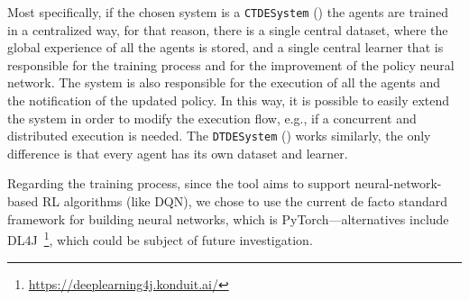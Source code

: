 Most specifically,
 if the chosen system is a \texttt{CTDESystem} () the agents are trained in a centralized way, 
 for that reason, there is  a single central dataset, 
 where the global experience of all the agents is stored, 
 and a single central learner that is responsible for the training process 
 and for the improvement of the policy neural network.
% 
The system is also responsible 
 for the execution of all the agents and the notification of the updated policy. 
 In this way, it is possible to easily extend the system in order to modify the execution flow, e.g., if a concurrent and distributed execution is needed. 
%
The \texttt{DTDESystem} () works similarly, 
 the only difference is that every agent has its own dataset and learner.


Regarding the training process,
 since the tool aims to support neural-network-based RL algorithms (like DQN),
 we chose to use the current de facto standard framework 
 for building neural networks, which is PyTorch---alternatives include DL4J~\footnote{\url{https://deeplearning4j.konduit.ai/}}, which could be subject of future investigation.
 

